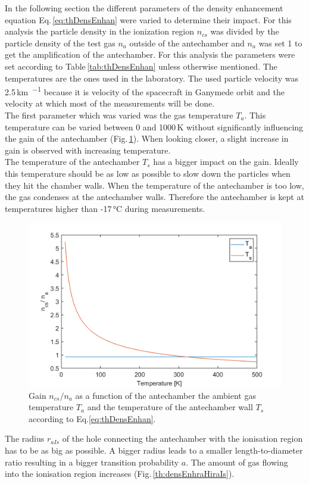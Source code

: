 		In the following section the different parameters of the density enhancement equation Eq.\,\eqref{eq:thDensEnhan} were varied to determine their impact. For this analysis the particle density in the ionization region $n_{cs}$ was divided by the particle density of the test gas $n_a$ outside of the antechamber and $n_a$ was set 1 to get the amplification of the antechamber. For this analysis the parameters were set according to Table\,\ref{tab:thDensEnhan} unless otherwise mentioned. The temperatures are the ones used in the laboratory. The used particle velocity was 2.5\,\si{\kilo\meter\per\sec} because it is velocity of the spacecraft in Ganymede orbit and the velocity at which most of the measurements will be done.\\		
		The first parameter which was varied was the gas temperature $T_a$. This temperature can be varied between 0 and 1000\,\si{\kelvin} without significantly influencing the gain of the antechamber (Fig.\,\ref{th:densEnhTaTs}). When looking closer, a slight increase in gain is observed with increasing temperature.\\
		The temperature of the antechamber $T_s$ has a bigger impact on the gain. Ideally this temperature should be as low as possible to slow down the particles when they hit the chamber walls. When the temperature of the antechamber is too low, the gas condenses at the antechamber walls. Therefore the antechamber is kept at temperatures higher than -17\,\si{\degreeCelsius} during measurements.
		\begin{figure}[h!] %
			\centering
			\includegraphics[width= .7\textwidth]{Bilder/Ta_Ts.png}
			\caption{Gain $n_{cs}/n_a$ as a function of the antechamber the ambient gas temperature $T_a$ and the temperature of the antechamber wall $T_s$ according to Eq.\eqref{eq:thDensEnhan}.}
			\label{th:densEnhTaTs}
		\end{figure}
		The radius $r_{aIs}$ of the hole connecting the antechamber with the ionisation region has to be as big as possible. A bigger radius leads to a smaller length-to-diameter ratio resulting in a bigger transition probability $a$. The amount of gas flowing into the ionisation region increases (Fig.\,\ref{th:densEnhraHiraIs}).\\
